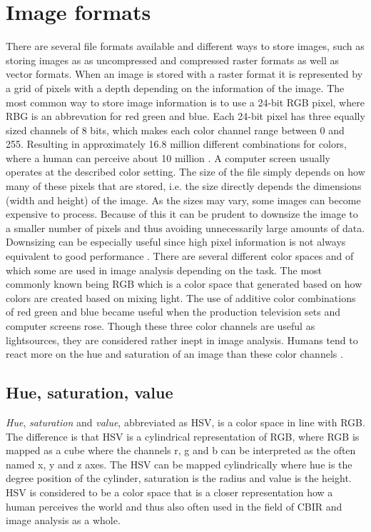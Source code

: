 \section{Image formats}
\label{sec:theory:image_formats}
There are several file formats available and different ways to store images, such as storing images as as uncompressed and compressed raster formats as well as vector formats. When an image is stored with a raster format it is represented by a grid of pixels with a depth depending on the information of the image. The most common way to store image information is to use a 24-bit RGB pixel, where RBG is an abbrevation for red green and blue. Each 24-bit pixel has three equally sized channels of 8 bits, which makes each color channel range between 0 and 255. Resulting in approximately 16.8 million different combinations for colors, where a human can perceive about 10 million \cite[p.388]{judd1975color}. A computer screen usually operates at the described color setting. The size of the file simply depends on how many of these pixels that are stored, i.e. the size directly depends the dimensions (width and height) of the image. As the sizes may vary, some images can become expensive to process. Because of this it can be prudent to downsize the image to a smaller number of pixels and thus avoiding unnecessarily large amounts of data. Downsizing can be especially useful since high pixel information is not always equivalent to good performance \cite{torralba200880}.
There are several different color spaces and of which some are used in image analysis depending on the task. The most commonly known being RGB which is a color space that generated based on how colors are created based on mixing light. The use of additive color combinations of red green and blue became useful when the production television sets and computer screens rose. Though these three color channels are useful as lightsources, they are considered rather inept in image analysis. Humans tend to react more on the hue and saturation of an image than these color channels \cite{alzu2015semantic}\cite{cheng2001color}. 

\subsection{Hue, saturation, value}
\label{sec:HSV_theory}
\emph{Hue}, \emph{saturation} and \emph{value}, abbreviated as HSV, is a color space in line with RGB. The difference is that HSV is a cylindrical representation of RGB, where RGB is mapped as a cube where the channels r, g and b can be interpreted as the often named x, y and z axes. The HSV can be mapped cylindrically where hue is the degree position of the cylinder, saturation is the radius and value is the height. HSV is considered to be a color space that is a closer representation how a human perceives the world and thus also often used in the field of CBIR and image analysis as a whole. 


